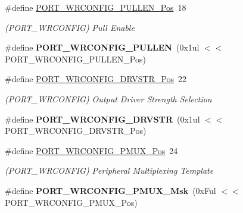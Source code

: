 \begin{DoxyCompactItemize}
\item 
\hypertarget{group___s_a_m_l21___p_o_r_t_ga69f7af299459c5a15bccf50da8b5240d}{}\#define \hyperlink{group___s_a_m_l21___p_o_r_t_ga69f7af299459c5a15bccf50da8b5240d}{P\+O\+R\+T\+\_\+\+W\+R\+C\+O\+N\+F\+I\+G\+\_\+\+P\+U\+L\+L\+E\+N\+\_\+\+Pos}~18\label{group___s_a_m_l21___p_o_r_t_ga69f7af299459c5a15bccf50da8b5240d}

\begin{DoxyCompactList}\small\item\em (P\+O\+R\+T\+\_\+\+W\+R\+C\+O\+N\+F\+I\+G) Pull Enable \end{DoxyCompactList}\item 
\hypertarget{group___s_a_m_l21___p_o_r_t_ga1b7efe7fb02e3da8402e319f0bd4314a}{}\#define {\bfseries P\+O\+R\+T\+\_\+\+W\+R\+C\+O\+N\+F\+I\+G\+\_\+\+P\+U\+L\+L\+E\+N}~(0x1ul $<$$<$ P\+O\+R\+T\+\_\+\+W\+R\+C\+O\+N\+F\+I\+G\+\_\+\+P\+U\+L\+L\+E\+N\+\_\+\+Pos)\label{group___s_a_m_l21___p_o_r_t_ga1b7efe7fb02e3da8402e319f0bd4314a}

\item 
\hypertarget{group___s_a_m_l21___p_o_r_t_gae2dd656b888ede1553412037840d6ac4}{}\#define \hyperlink{group___s_a_m_l21___p_o_r_t_gae2dd656b888ede1553412037840d6ac4}{P\+O\+R\+T\+\_\+\+W\+R\+C\+O\+N\+F\+I\+G\+\_\+\+D\+R\+V\+S\+T\+R\+\_\+\+Pos}~22\label{group___s_a_m_l21___p_o_r_t_gae2dd656b888ede1553412037840d6ac4}

\begin{DoxyCompactList}\small\item\em (P\+O\+R\+T\+\_\+\+W\+R\+C\+O\+N\+F\+I\+G) Output Driver Strength Selection \end{DoxyCompactList}\item 
\hypertarget{group___s_a_m_l21___p_o_r_t_gaaa9cec94d7f7ebc2df0d6ce88456c797}{}\#define {\bfseries P\+O\+R\+T\+\_\+\+W\+R\+C\+O\+N\+F\+I\+G\+\_\+\+D\+R\+V\+S\+T\+R}~(0x1ul $<$$<$ P\+O\+R\+T\+\_\+\+W\+R\+C\+O\+N\+F\+I\+G\+\_\+\+D\+R\+V\+S\+T\+R\+\_\+\+Pos)\label{group___s_a_m_l21___p_o_r_t_gaaa9cec94d7f7ebc2df0d6ce88456c797}

\item 
\hypertarget{group___s_a_m_l21___p_o_r_t_gad821493573ea6954861bdb5007458439}{}\#define \hyperlink{group___s_a_m_l21___p_o_r_t_gad821493573ea6954861bdb5007458439}{P\+O\+R\+T\+\_\+\+W\+R\+C\+O\+N\+F\+I\+G\+\_\+\+P\+M\+U\+X\+\_\+\+Pos}~24\label{group___s_a_m_l21___p_o_r_t_gad821493573ea6954861bdb5007458439}

\begin{DoxyCompactList}\small\item\em (P\+O\+R\+T\+\_\+\+W\+R\+C\+O\+N\+F\+I\+G) Peripheral Multiplexing Template \end{DoxyCompactList}\item 
\hypertarget{group___s_a_m_l21___p_o_r_t_gaed50ce1ba0629befed40ccf940ea623e}{}\#define {\bfseries P\+O\+R\+T\+\_\+\+W\+R\+C\+O\+N\+F\+I\+G\+\_\+\+P\+M\+U\+X\+\_\+\+Msk}~(0x\+Ful $<$$<$ P\+O\+R\+T\+\_\+\+W\+R\+C\+O\+N\+F\+I\+G\+\_\+\+P\+M\+U\+X\+\_\+\+Pos)\label{group___s_a_m_l21___p_o_r_t_gaed50ce1ba0629befed40ccf940ea623e}


\end{DoxyCompactItemize}
